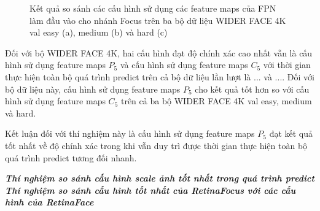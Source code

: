 {    \begin{figure}[H]
        \centering
        \caption{Kết quả so sánh các cấu hình sử dụng các feature maps của FPN làm đầu vào cho nhánh Focus trên ba bộ dữ liệu WIDER FACE 4K val easy (a), medium (b) và hard (c)}
        \label{fig:retinafocus_widerface_4k_val_fpn}
    \end{figure}

    \noindent
    Đối với bộ WIDER FACE 4K, hai cấu hình đạt độ chính xác cao nhất vẫn là cấu hình sử dụng feature maps ${P}_{5}$ và cấu hình sử dụng feature maps ${C}_{5}$ với thời gian thực hiện toàn bộ quá trình predict trên cả bộ dữ liệu lần lượt là ... và ....
    Đối với bộ dữ liệu này, cấu hình sử dụng feature maps ${P}_{5}$ cho kết quả tốt hơn so với cấu hình sử dụng feature maps ${C}_{5}$ trên cả ba bộ WIDER FACE 4K val easy, medium và hard.

    \noindent
    Kết luận đối với thí nghiệm này là cấu hình sử dụng feature maps ${P}_{5}$ đạt kết quả tốt nhất về độ chính xác trong khi vẫn duy trì được thời gian thực hiện toàn bộ quá trình predict tương đối nhanh.

    \noindent
    \textbf{\textit{Thí nghiệm so sánh cấu hình scale ảnh tốt nhất trong quá trình predict}} \\

    \noindent
    \textbf{\textit{Thí nghiệm so sánh cấu hình tốt nhất của RetinaFocus với các cấu hình của RetinaFace}} \\
    
}